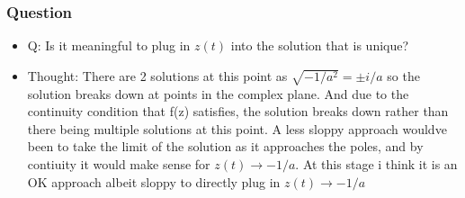 \subsubsection*{Question}
\begin{itemize}
    \item{Q}: Is it meaningful to plug in $z(t)$ into the solution that is unique?
    \item{Thought:} There are 2 solutions at this point as $\sqrt{-1/a^2} = \pm i/a$ so the solution breaks down at points in the complex plane. And due to the continuity condition that f(z) satisfies, the solution breaks down rather than there being multiple solutions at this point. A less sloppy approach wouldve been to take the limit of the solution as it approaches the poles, and by contiuity it would make sense for $z(t)\rightarrow -1/a$. At this stage i think it is an OK approach albeit sloppy to directly plug in $z(t)\rightarrow -1/a$
\end{itemize}
